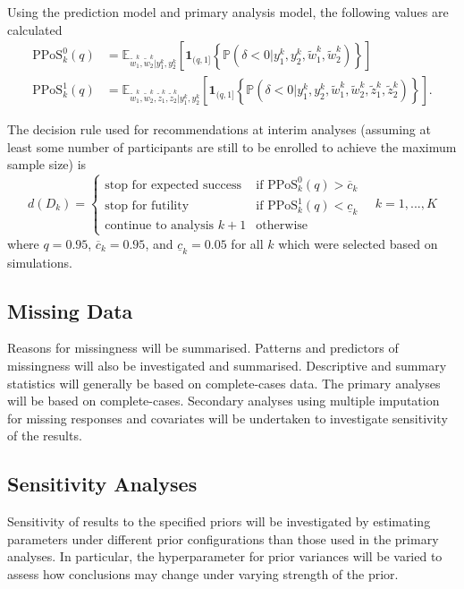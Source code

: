\documentclass{bmcart}
\begin{document}
Using the prediction model and primary analysis model, the following values are calculated
$$
\begin{aligned}
\text{PPoS}_k^0(q) &= \mathbb E_{\tilde w_1^k,\tilde w_2^k|y_1^k,y_2^k}\left[\textbf{1}_{(q,1]}\left\{\mathbb P\left(\delta<0|y_1^k,y_2^k,\tilde w_1^k,\tilde w_2^k\right)\right\}\right] \\
\text{PPoS}_k^1(q) &= \mathbb E_{\tilde w_1^k,\tilde w_2^k,\tilde z_1^k,\tilde z_2^k|y_1^k,y_2^k}\left[\textbf{1}_{(q,1]}\left\{\mathbb P\left(\delta<0|y_1^k,y_2^k,\tilde w_1^k,\tilde w_2^k,\tilde z_1^k,\tilde z_2^k\right)\right\}\right].
\end{aligned}
$$

The decision rule used for recommendations at interim analyses (assuming at least some number of participants are still to be enrolled to achieve the maximum sample size) is
$$
d(D_k)=\begin{cases}
\text{stop for expected success} & \text{if } \text{PPoS}_k^0(q) > \overline{c}_k \\
\text{stop for futility} & \text{if } \text{PPoS}_k^1(q) < \underline{c}_k \\
\text{continue to analysis }k+1 &\text{otherwise}
\end{cases} \quad k=1,...,K
$$
where $q=0.95$, $\overline{c}_k=0.95$, and $\underline{c}_k=0.05$ for all $k$ which were selected based on simulations.

\subsection*{Missing Data}

Reasons for missingness will be summarised.
Patterns and predictors of missingness will also be investigated and summarised.
Descriptive and summary statistics will generally be based on complete-cases data.
The primary analyses will be based on complete-cases.
Secondary analyses using multiple imputation for missing responses and covariates will be undertaken to investigate sensitivity of the results.

\subsection*{Sensitivity Analyses}

Sensitivity of results to the specified priors will be investigated by estimating parameters under different prior configurations than those used in the primary analyses.
In particular, the hyperparameter for prior variances will be varied to assess how conclusions may change under varying strength of the prior.
\end{document}
